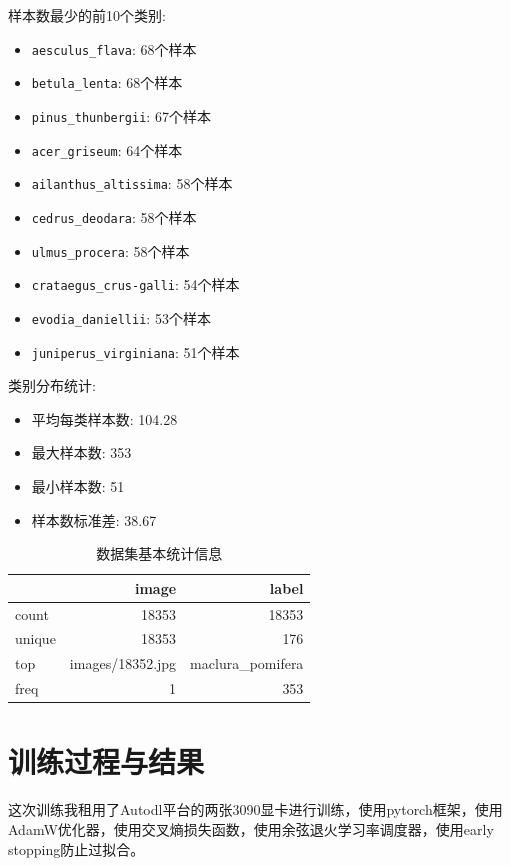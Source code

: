\documentclass[12pt,a4paper,UTF8]{article}
\begin{document}
样本数最少的前10个类别:
\begin{itemize}
    \item \texttt{aesculus\_flava}: 68个样本
    \item \texttt{betula\_lenta}: 68个样本
    \item \texttt{pinus\_thunbergii}: 67个样本
    \item \texttt{acer\_griseum}: 64个样本
    \item \texttt{ailanthus\_altissima}: 58个样本
    \item \texttt{cedrus\_deodara}: 58个样本
    \item \texttt{ulmus\_procera}: 58个样本
    \item \texttt{crataegus\_crus-galli}: 54个样本
    \item \texttt{evodia\_daniellii}: 53个样本
    \item \texttt{juniperus\_virginiana}: 51个样本
\end{itemize}

类别分布统计:
\begin{itemize}
    \item 平均每类样本数: 104.28
    \item 最大样本数: 353
    \item 最小样本数: 51
    \item 样本数标准差: 38.67
\end{itemize}


\begin{table}[htbp]
    \centering
    \begin{tabular}{lrr}
        \hline
        & image & label \\
        \hline
        count & 18353 & 18353 \\
        unique & 18353 & 176 \\
        top & images/18352.jpg & maclura\_pomifera \\
        freq & 1 & 353 \\
        \hline
    \end{tabular}
    \caption{数据集基本统计信息}
    \label{tab:dataset-stats}
\end{table}

\section{训练过程与结果}

这次训练我租用了Autodl平台的两张3090显卡进行训练，使用pytorch框架，使用AdamW优化器，使用交叉熵损失函数，使用余弦退火学习率调度器，使用early stopping防止过拟合。
\end{document}
